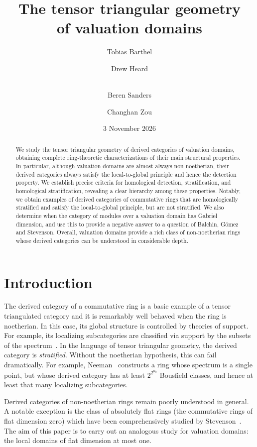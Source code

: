 \documentclass{amsart}
\title[The tensor triangular geometry of valuation domains]{The tensor triangular geometry \\ of valuation domains}
\author[T.~Barthel]{Tobias Barthel}
\author[D.~Heard]{Drew Heard}
\author[B.~Sanders]{\\Beren Sanders}
\author[C.~Zou]{Changhan Zou}
\date{3 November 2026}
\numberwithin{equation}{section}%
\theoremstyle{remark}
\begin{document}
\begin{abstract}
	We study the tensor triangular geometry of derived categories of valuation domains, obtaining complete ring-theoretic characterizations of their main structural properties. In particular, although valuation domains are almost always non-noetherian, their derived categories always satisfy the local-to-global principle and hence the detection property. We \mbox{establish} precise criteria for homological detection, stratification, and homological \mbox{stratification,} revealing a clear hierarchy among these properties. Notably, we obtain \mbox{examples} of derived categories of commutative rings that are homologically stratified and satisfy the local-to-global principle, but are not stratified. We also determine when the category of modules over a valuation domain has Gabriel dimension, and use this to provide a negative answer to a question of Balchin, G\'omez and Stevenson. Overall, valuation domains provide a rich class of \mbox{non-noetherian} rings whose derived categories can be understood in considerable depth.
\end{abstract}

\vspace*{0.5em}%
\maketitle

{
\hypersetup{linkcolor=black}
\tableofcontents
}

\section{Introduction}
The derived category of a commutative ring is a basic example of a tensor \mbox{triangulated} category and it is remarkably well behaved when the ring is \mbox{noetherian.} In this case, its global structure is controlled by theories of support. For example, its localizing subcategories are classified via support by the subsets of the spectrum~\cite{Neeman92a}. In the language of tensor triangular geometry, the derived category is \emph{stratified}. Without the noetherian hypothesis, this can fail dramatically. For example, Neeman~\cite{Neeman00} constructs a ring whose spectrum is a single point, but whose derived category has at least $2^{2^{\aleph_0}}$ Bousfield classes, and hence at least that many localizing subcategories.

Derived categories of non-noetherian rings remain poorly understood in general. A notable exception is the class of absolutely flat rings (the commutative rings of flat dimension zero) which have been comprehensively studied by Stevenson~\cite{Stevenson14a}. The aim of this paper is to carry out an analogous study for valuation domains: the local domains of flat dimension at most one.
\end{document}
